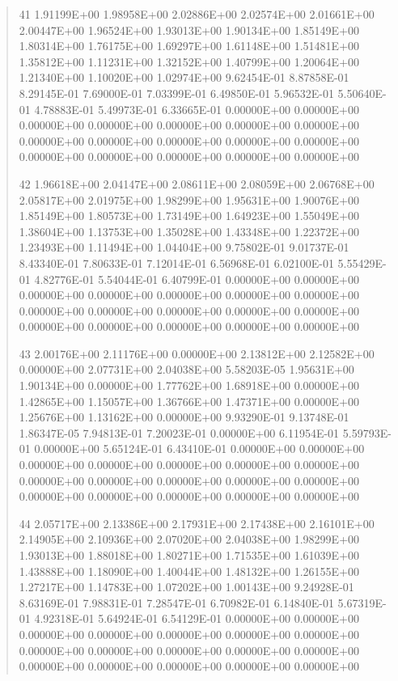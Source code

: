 \documentclass[letterpaper,10pt,english]{sphinxmanual}
\begin{document}
\begin{quote}
\begin{DUlineblock}{0em}
\item[] 41   1.91199E+00  1.98958E+00  2.02886E+00  2.02574E+00  2.01661E+00  2.00447E+00  1.96524E+00  1.93013E+00  1.90134E+00  1.85149E+00  1.80314E+00  1.76175E+00  1.69297E+00  1.61148E+00  1.51481E+00  1.35812E+00  1.11231E+00  1.32152E+00  1.40799E+00  1.20064E+00  1.21340E+00  1.10020E+00  1.02974E+00  9.62454E-01  8.87858E-01  8.29145E-01  7.69000E-01  7.03399E-01  6.49850E-01  5.96532E-01  5.50640E-01  4.78883E-01  5.49973E-01  6.33665E-01  0.00000E+00  0.00000E+00  0.00000E+00  0.00000E+00  0.00000E+00  0.00000E+00  0.00000E+00  0.00000E+00  0.00000E+00  0.00000E+00  0.00000E+00  0.00000E+00  0.00000E+00  0.00000E+00  0.00000E+00  0.00000E+00  0.00000E+00
\item[] 42   1.96618E+00  2.04147E+00  2.08611E+00  2.08059E+00  2.06768E+00  2.05817E+00  2.01975E+00  1.98299E+00  1.95631E+00  1.90076E+00  1.85149E+00  1.80573E+00  1.73149E+00  1.64923E+00  1.55049E+00  1.38604E+00  1.13753E+00  1.35028E+00  1.43348E+00  1.22372E+00  1.23493E+00  1.11494E+00  1.04404E+00  9.75802E-01  9.01737E-01  8.43340E-01  7.80633E-01  7.12014E-01  6.56968E-01  6.02100E-01  5.55429E-01  4.82776E-01  5.54044E-01  6.40799E-01  0.00000E+00  0.00000E+00  0.00000E+00  0.00000E+00  0.00000E+00  0.00000E+00  0.00000E+00  0.00000E+00  0.00000E+00  0.00000E+00  0.00000E+00  0.00000E+00  0.00000E+00  0.00000E+00  0.00000E+00  0.00000E+00  0.00000E+00
\item[] 43   2.00176E+00  2.11176E+00  0.00000E+00  2.13812E+00  2.12582E+00  0.00000E+00  2.07731E+00  2.04038E+00  5.58203E-05  1.95631E+00  1.90134E+00  0.00000E+00  1.77762E+00  1.68918E+00  0.00000E+00  1.42865E+00  1.15057E+00  1.36766E+00  1.47371E+00  0.00000E+00  1.25676E+00  1.13162E+00  0.00000E+00  9.93290E-01  9.13748E-01  1.86347E-05  7.94813E-01  7.20023E-01  0.00000E+00  6.11954E-01  5.59793E-01  0.00000E+00  5.65124E-01  6.43410E-01  0.00000E+00  0.00000E+00  0.00000E+00  0.00000E+00  0.00000E+00  0.00000E+00  0.00000E+00  0.00000E+00  0.00000E+00  0.00000E+00  0.00000E+00  0.00000E+00  0.00000E+00  0.00000E+00  0.00000E+00  0.00000E+00  0.00000E+00
\item[] 44   2.05717E+00  2.13386E+00  2.17931E+00  2.17438E+00  2.16101E+00  2.14905E+00  2.10936E+00  2.07020E+00  2.04038E+00  1.98299E+00  1.93013E+00  1.88018E+00  1.80271E+00  1.71535E+00  1.61039E+00  1.43888E+00  1.18090E+00  1.40044E+00  1.48132E+00  1.26155E+00  1.27217E+00  1.14783E+00  1.07202E+00  1.00143E+00  9.24928E-01  8.63169E-01  7.98831E-01  7.28547E-01  6.70982E-01  6.14840E-01  5.67319E-01  4.92318E-01  5.64924E-01  6.54129E-01  0.00000E+00  0.00000E+00  0.00000E+00  0.00000E+00  0.00000E+00  0.00000E+00  0.00000E+00  0.00000E+00  0.00000E+00  0.00000E+00  0.00000E+00  0.00000E+00  0.00000E+00  0.00000E+00  0.00000E+00  0.00000E+00  0.00000E+00

\end{DUlineblock}
\end{quote}
\end{document}
